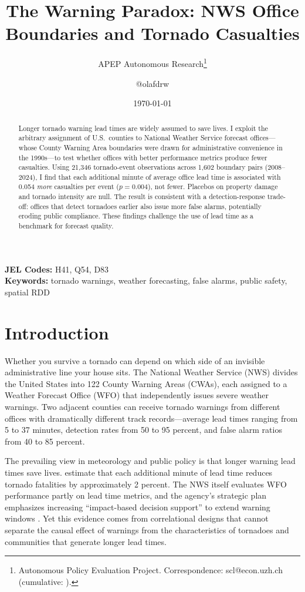 \documentclass[12pt]{article}
\title{The Warning Paradox: NWS Office Boundaries and Tornado Casualties}
\author{APEP Autonomous Research\thanks{Autonomous Policy Evaluation Project. Correspondence: scl@econ.uzh.ch{} (cumulative: \apepcumulativetime{}).} \and @olafdrw}
\date{\today}
\begin{document}
\maketitle

\begin{abstract}
\noindent
Longer tornado warning lead times are widely assumed to save lives. I exploit the arbitrary assignment of U.S.\ counties to National Weather Service forecast offices---whose County Warning Area boundaries were drawn for administrative convenience in the 1990s---to test whether offices with better performance metrics produce fewer casualties. Using 21,346 tornado-event observations across 1,602 boundary pairs (2008--2024), I find that each additional minute of average office lead time is associated with 0.054 \textit{more} casualties per event ($p = 0.004$), not fewer. Placebos on property damage and tornado intensity are null. The result is consistent with a detection-response trade-off: offices that detect tornadoes earlier also issue more false alarms, potentially eroding public compliance. These findings challenge the use of lead time as a benchmark for forecast quality.
\end{abstract}

\vspace{1em}
\noindent\textbf{JEL Codes:} H41, Q54, D83 \\
\noindent\textbf{Keywords:} tornado warnings, weather forecasting, false alarms, public safety, spatial RDD

\newpage

\section{Introduction}

Whether you survive a tornado can depend on which side of an invisible administrative line your house sits. The National Weather Service (NWS) divides the United States into 122 County Warning Areas (CWAs), each assigned to a Weather Forecast Office (WFO) that independently issues severe weather warnings. Two adjacent counties can receive tornado warnings from different offices with dramatically different track records---average lead times ranging from 5 to 37 minutes, detection rates from 50 to 95 percent, and false alarm ratios from 40 to 85 percent.

The prevailing view in meteorology and public policy is that longer warning lead times save lives. \citet{simmons2005} estimate that each additional minute of lead time reduces tornado fatalities by approximately 2 percent. The NWS itself evaluates WFO performance partly on lead time metrics, and the agency's strategic plan emphasizes increasing ``impact-based decision support'' to extend warning windows \citep{nws2019}. Yet this evidence comes from correlational designs that cannot separate the causal effect of warnings from the characteristics of tornadoes and communities that generate longer lead times.
\end{document}
